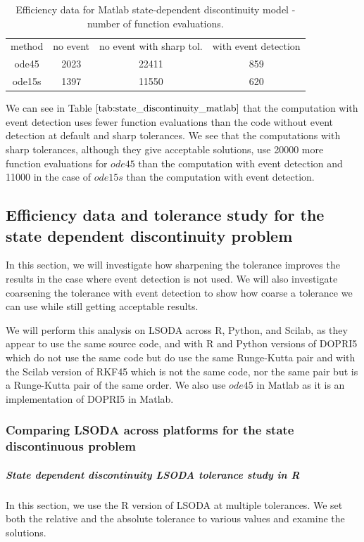 \begin{table}[h]
\caption {Efficiency data for Matlab state-dependent discontinuity model - number of function evaluations.} \label{tab:state_discontinuity_matlab}
\begin{center}
\begin{tabular}{ c c c c } 
method & no event & no event with sharp tol. & with event detection \\ 
ode45 & 2023 & 22411 & 859 \\
ode15s & 1397 & 11550 & 620 \\
\end{tabular}
\end{center}
\end{table}

We can see in Table $\ref{tab:state_discontinuity_matlab}$ that the computation with event detection uses fewer function evaluations than the code without event detection at default and sharp tolerances. We see that the computations with sharp tolerances, although they give acceptable solutions, use 20000 more function evaluations for $ode45$ than the computation with event detection and 11000 in the case of $ode15s$ than the computation with event detection.

\subsection{Efficiency data and tolerance study for the state dependent discontinuity problem}
\label{subsection:state_tolerance_study}
In this section, we will investigate how sharpening the tolerance improves the results in the case where event detection is not used. We will also investigate coarsening the tolerance with event detection to show how coarse a tolerance we can use while still getting acceptable results.

We will perform this analysis on LSODA across R, Python, and Scilab, as they appear to use the same source code, and with R and Python versions of DOPRI5 which do not use the same code but do use the same Runge-Kutta pair and with the Scilab version of RKF45 which is not the same code, nor the same pair but is a Runge-Kutta pair of the same order. We also use $ode45$ in Matlab as it is an implementation of DOPRI5 in Matlab. 

\subsubsection{Comparing LSODA across platforms for the state discontinuous problem}
\subparagraph{State dependent discontinuity LSODA tolerance study in R}
In this section, we use the R version of LSODA at multiple tolerances. We set both the relative and the absolute tolerance to various values and examine the solutions.

